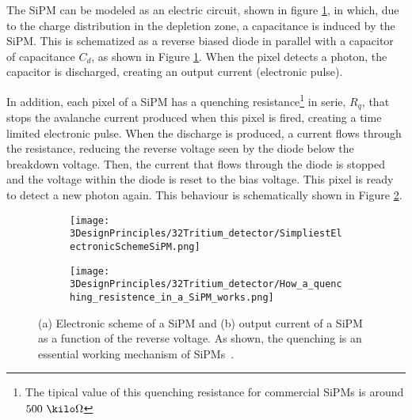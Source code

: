 
The SiPM can be modeled as an electric circuit, shown in figure \ref{subfig:ElectricModelSiPM}, in which, due to the charge distribution in the depletion zone, a capacitance is induced by the SiPM. This is schematized as a reverse biased diode in parallel with a capacitor of capacitance $C_d$, as shown in Figure \ref{subfig:ElectricModelSiPM}. When the pixel detects a photon, the capacitor is discharged, creating an output current (electronic pulse).

In addition, each pixel of a SiPM has a quenching resistance\footnote{The tipical value of this quenching resistance for commercial SiPMs is around $500~\kilo\Omega$} in serie, $R_q$, that stops the avalanche current produced when this pixel is fired, creating a time limited electronic pulse. When the discharge is produced, a current flows through the resistance, reducing the reverse voltage seen by the diode below the breakdown voltage. Then, the current that flows through the diode is stopped and the voltage within the diode is reset to the bias voltage. This pixel is ready to detect a new photon again. This behaviour is schematically shown in Figure \ref{subfig:HowSiPMworks}.

\begin{figure}
\centering
    \begin{subfigure}[]{0.45\textwidth}
    \centering
    \texttt{[image: 3DesignPrinciples/32Tritium\_detector/SimpliestElectronicSchemeSiPM.png]}  
    \caption{\label{subfig:ElectricModelSiPM}}
    \end{subfigure}
    \hfill
    \begin{subfigure}[]{0.45\textwidth}
    \centering
    \texttt{[image: 3DesignPrinciples/32Tritium\_detector/How\_a\_quenching\_resistence\_in\_a\_SiPM\_works.png]}  
    \caption{\label{subfig:HowSiPMworks}}
    \end{subfigure}
 \caption{(a) Electronic scheme of a SiPM and (b) output current of a SiPM as a function of the reverse voltage. As shown, the quenching is an essential working mechanism of SiPMs~\cite{DataSheetSensL}.}
 \label{fig:ChenchingResistance}
\end{figure}

